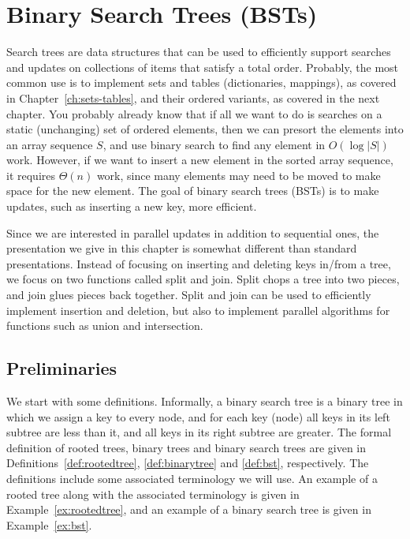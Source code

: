 \chapter{Binary Search Trees (BSTs)}
\label{ch:bst}

Search trees are data structures that can be used to efficiently
support searches and updates on collections of items that satisfy a
total order.  Probably, the most common use is to implement sets and
tables (dictionaries, mappings), as covered in
Chapter~\ref{ch:sets-tables}, and their ordered variants, as covered
in the next chapter.  You probably already know that if all we want to
do is searches on a static (unchanging) set of ordered elements, then
we can presort the elements into an array sequence $S$, and use binary
search to find any element in $O(\log |S|)$ work.  However, if we want
to insert a new element in the sorted array sequence, it requires
$\Theta(n)$ work, since many elements may need to be moved to make
space for the new element.  The goal of binary search trees (BSTs) is
to make updates, such as inserting a new key, more efficient.  

Since we are interested in parallel updates in addition to sequential
ones, the presentation we give in this chapter is somewhat different
than standard presentations.  Instead of focusing on inserting and
deleting keys in/from a tree, we focus on two functions called split
and join.  Split chops a tree into two pieces, and join glues pieces
back together.  Split and join can be used to efficiently implement
insertion and deletion, but also to implement parallel algorithms for
functions such as union and intersection.

\section*{Preliminaries}

We start with some definitions.  Informally, a binary search tree is a
binary tree in which we assign a key to every node, and for each key
(node) all keys in its left subtree are less than it, and all keys in
its right subtree are greater.  The formal definition of rooted trees,
binary trees and binary search trees are given in
Definitions~\ref{def:rootedtree}, \ref{def:binarytree} and
\ref{def:bst}, respectively.  The definitions include some associated
terminology we will use.  An example of a rooted tree along with the
associated terminology is given in Example~\ref{ex:rootedtree}, and an
example of a binary search tree is given in Example~\ref{ex:bst}.

